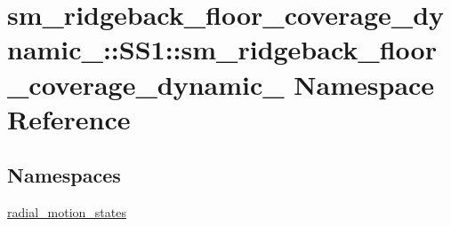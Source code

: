 \hypertarget{namespacesm__ridgeback__floor__coverage__dynamic__1_1_1SS1_1_1sm__ridgeback__floor__coverage__dynamic__1}{}\section{sm\+\_\+ridgeback\+\_\+floor\+\_\+coverage\+\_\+dynamic\+\_\+:\+:S\+S1\+:\+:sm\+\_\+ridgeback\+\_\+floor\+\_\+coverage\+\_\+dynamic\+\_ Namespace Reference}
\label{namespacesm__ridgeback__floor__coverage__dynamic__1_1_1SS1_1_1sm__ridgeback__floor__coverage__dynamic__1}
\subsection*{Namespaces}
\begin{DoxyCompactItemize}
\item 
 \hyperlink{namespacesm__ridgeback__floor__coverage__dynamic__1_1_1SS1_1_1sm__ridgeback__floor__coverage__dy8a0be66cafdbe893e97ae1235d652522}{radial\+\_\+motion\+\_\+states}
\end{DoxyCompactItemize}
